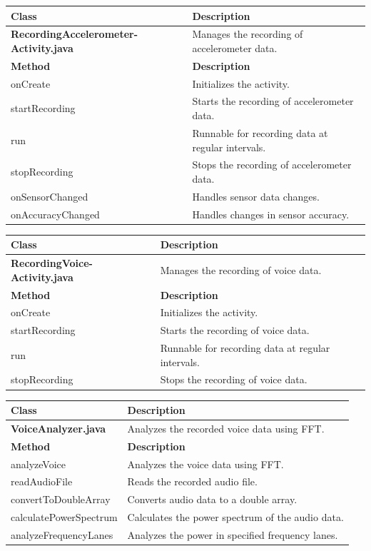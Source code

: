 \documentclass[12pt,a4paper]{article}
\begin{document}
\begin{longtable}{|p{5cm}|p{10cm}|}
\hline
\textbf{Class} & \textbf{Description} \\
\hline
\textbf{RecordingAccelerometer-Activity.java} & Manages the recording of accelerometer data. \\
\hline
\textbf{Method} & \textbf{Description} \\
\hline
onCreate & Initializes the activity. \\
startRecording & Starts the recording of accelerometer data. \\
run & Runnable for recording data at regular intervals. \\
stopRecording & Stops the recording of accelerometer data. \\
onSensorChanged & Handles sensor data changes. \\
onAccuracyChanged & Handles changes in sensor accuracy. \\
\hline
\end{longtable}

\begin{longtable}{|p{5cm}|p{10cm}|}
\hline
\textbf{Class} & \textbf{Description} \\
\hline
\textbf{RecordingVoice-Activity.java} & Manages the recording of voice data. \\
\hline
\textbf{Method} & \textbf{Description} \\
\hline
onCreate & Initializes the activity. \\
startRecording & Starts the recording of voice data. \\
run & Runnable for recording data at regular intervals. \\
stopRecording & Stops the recording of voice data. \\
\hline
\end{longtable}

\begin{longtable}{|p{5cm}|p{10cm}|}
\hline
\textbf{Class} & \textbf{Description} \\
\hline
\textbf{VoiceAnalyzer.java} & Analyzes the recorded voice data using FFT. \\
\hline
\textbf{Method} & \textbf{Description} \\
\hline
analyzeVoice & Analyzes the voice data using FFT. \\
readAudioFile & Reads the recorded audio file. \\
convertToDoubleArray & Converts audio data to a double array. \\
calculatePowerSpectrum & Calculates the power spectrum of the audio data. \\
analyzeFrequencyLanes & Analyzes the power in specified frequency lanes. \\
\hline
\end{longtable}
\end{document}
